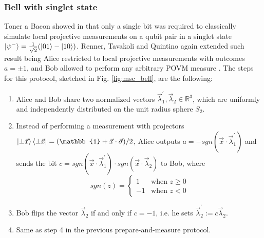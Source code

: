 \subsubsection{Bell with singlet state}\label{section:protocol_bell}
Toner a Bacon showed in \cite{toner2003} that only a single bit was required to classically simulate local projective measurements on a qubit pair in a singlet state $\ket{\psi^{-}}=\frac{1}{\sqrt{2}}(\ket{01} - \ket{10})$. Renner, Tavakoli and Quintino again extended such result being Alice restricted to local projective measurements with outcomes $a=\pm 1$, and Bob allowed to perform any arbitrary POVM measure \cite{renner2022}. The steps for this protocol, sketched in Fig. \ref{fig:msc_bell}, are the following:
\begin{enumerate}
 \item Alice and Bob share two normalized vectors $\vec{\lambda}_1^{\prime}, \vec{\lambda}_2 \in \mathbb{R}^{3}$, which are uniformly and independently distributed on the unit radius sphere $S_2$.
 \item Instead of performing a measurement with projectors $\ket{\pm\vec{x}}\bra{\pm\vec{x}} = (\mathbb{1} + \vec{x} \cdot \vec{\sigma})/2$, Alice outputs $a = -sgn(\vec{x} \cdot \vec{\lambda}^{\prime}_1)$ and sends the bit $c = sgn(\vec{x} \cdot \vec{\lambda}^{\prime}_1) \cdot sgn(\vec{x} \cdot \vec{\lambda}_2)$ to Bob, where 
 \begin{equation}
sgn(z) =
    \begin{cases}
      1 & \text{when $z \ge 0$}\\
      -1 & \text{when $z<0$}
    \end{cases} 
\end{equation}
 \item Bob flips the vector $\vec{\lambda}_2$ if and only if $c=-1$, i.e. he sets $\vec{\lambda}^{\prime}_{2} := c \vec{\lambda}_{2}$.
 \item Same as step 4 in the previous prepare-and-measure protocol.
\end{enumerate}

